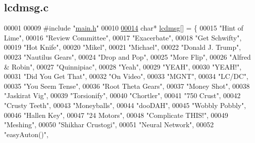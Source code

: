 \hypertarget{lcdmsg_8c_source}{}\subsection{lcdmsg.\+c}
\label{lcdmsg_8c_source}

\begin{DoxyCode}
00001 
00009 \textcolor{preprocessor}{#include "\hyperlink{main_8h}{main.h}"}
00010 
\hypertarget{lcdmsg_8c_source.tex_l00014}{}\hyperlink{lcdmsg_8h_abbcf1856a4c9063200ef3f4131fd05f5}{00014} \textcolor{keywordtype}{char}* \hyperlink{lcdmsg_8c_abbcf1856a4c9063200ef3f4131fd05f5}{lcdmsg}[] = \{
00015     \textcolor{stringliteral}{"Hint of Lime"},
00016     \textcolor{stringliteral}{"Review Committee"},
00017     \textcolor{stringliteral}{"Exacerbate"},
00018     \textcolor{stringliteral}{"Get Schwifty"},
00019     \textcolor{stringliteral}{"Hot Knife"},
00020     \textcolor{stringliteral}{"Mikel"},
00021     \textcolor{stringliteral}{"Michael"},
00022     \textcolor{stringliteral}{"Donald J. Trump"},
00023     \textcolor{stringliteral}{"Nautilus Gears"},
00024     \textcolor{stringliteral}{"Drop and Pop"},
00025     \textcolor{stringliteral}{"More Flip"},
00026     \textcolor{stringliteral}{"Alfred & Robin"},
00027     \textcolor{stringliteral}{"Quinnipiac"},
00028     \textcolor{stringliteral}{"Yeah"},
00029     \textcolor{stringliteral}{"YEAH"},
00030     \textcolor{stringliteral}{"YEAH!"},
00031     \textcolor{stringliteral}{"Did You Get That"},
00032     \textcolor{stringliteral}{"On Video"},
00033     \textcolor{stringliteral}{"MGNT"},
00034     \textcolor{stringliteral}{"LC/DC"},
00035     \textcolor{stringliteral}{"You Seem Tense"},
00036     \textcolor{stringliteral}{"Root Theta Gears"},
00037     \textcolor{stringliteral}{"Money Shot"},
00038     \textcolor{stringliteral}{"Jaskirat Vig"},
00039     \textcolor{stringliteral}{"Torsionify"},
00040     \textcolor{stringliteral}{"Chortler"},
00041     \textcolor{stringliteral}{"750 Crust"},
00042     \textcolor{stringliteral}{"Crusty Teeth"},
00043     \textcolor{stringliteral}{"Moneyballs"},
00044     \textcolor{stringliteral}{"dooDAH"},
00045     \textcolor{stringliteral}{"Wobbly Pobbly"},
00046     \textcolor{stringliteral}{"Hallen Key"},
00047     \textcolor{stringliteral}{"24 Motors"},
00048     \textcolor{stringliteral}{"Complicate THIS!"},
00049     \textcolor{stringliteral}{"Meshing"},
00050     \textcolor{stringliteral}{"Shikhar Crustogi"},
00051     \textcolor{stringliteral}{"Neural Network"},
00052     \textcolor{stringliteral}{"easyAuton()"},

\end{DoxyCode}
